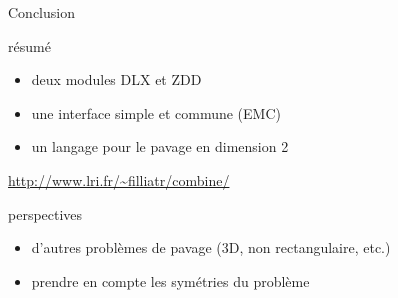 \documentclass{beamer}
\let\emph\alert
\begin{document}
\begin{frame}{Conclusion}

résumé
\begin{itemize}
\item deux modules DLX et ZDD
\item une interface simple et commune (EMC)
\item un langage pour le pavage en dimension 2
\end{itemize}

\begin{center}
  \emph{\url{http://www.lri.fr/~filliatr/combine/}}
\end{center}

\bigskip
perspectives
\begin{itemize}
\item d'autres problèmes de pavage (3D, non rectangulaire, etc.)
\item prendre en compte les symétries du problème
\end{itemize}



\end{frame}
\end{document}
